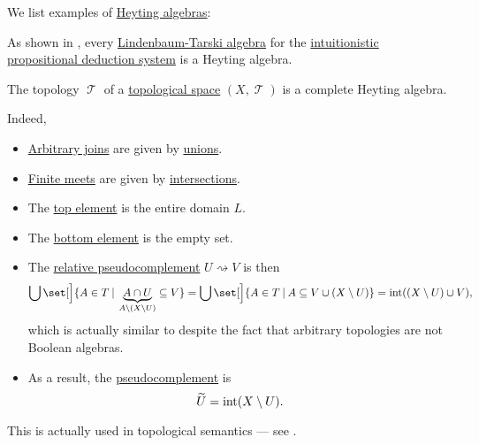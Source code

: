 \begin{example}\label{ex:def:heyting_algebra}
  We list examples of \hyperref[def:heyting_algebra]{Heyting algebras}:
  \begin{thmenum}
     As shown in , every \hyperref[def:lindenbaum_tarski_algebra]{Lindenbaum-Tarski algebra} for the \hyperref[def:intuitionistic_propositional_deduction_systems]{intuitionistic propositional deduction system} is a Heyting algebra.

     The topology \( \mscrT \) of a \hyperref[def:topological_space]{topological space} \( (X, \mscrT) \) is a complete Heyting algebra.

    Indeed,
    \begin{itemize}
      \item \hyperref[def:lattice/join]{Arbitrary joins} are given by \hyperref[def:basic_set_operations/union]{unions}.
      \item \hyperref[def:lattice/meet]{Finite meets} are given by \hyperref[def:basic_set_operations/intersection]{intersections}.
      \item The \hyperref[def:extremal_points/top_and_bottom]{top element} is the entire domain \( L \).
      \item The \hyperref[def:extremal_points/top_and_bottom]{bottom element} is the empty set.
      \item The \hyperref[def:heyting_algebra]{relative pseudocomplement} \( U \rightsquigarrow V \) is then
      \begin{equation*}
        \bigcup\set[\Big]{ A \in T \given \underbrace{A \cap U}_{A \setminus (X \setminus U)} \subseteq V }
        =
        \bigcup\set[\Big]{ A \in T \given A \subseteq V \cup (X \setminus U) }
        =
        \Int((X \setminus U) \cup V),
      \end{equation*}
      which is actually similar to  despite the fact that arbitrary topologies are not Boolean algebras.

      \item As a result, the \hyperref[def:heyting_algebra/pseudocomplement]{pseudocomplement} is
      \begin{equation*}
        \widetilde U = \operatorname{int}(X \setminus U).
      \end{equation*}
    \end{itemize}

    This is actually used in topological semantics --- see .
  \end{thmenum}
\end{example}

